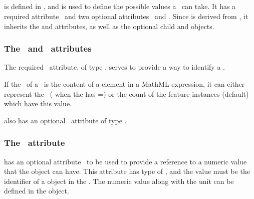 \subsection{}
\label{def:PossibleSpeciesFeatureValue}

 is defined in , and is used to define the possible values a \speciesFeature\ can take. It has a required attribute \idAtt\ and two optional attributes \nameAtt\ and \numericValueAtt.  Since  is derived from , it inherits the  and  attributes, as well as the optional \mBlockChangedBegin{\revTwentyTwentyMarch}child\mBlockChangedEnd{\revTwentyTwentyMarch}  and  objects. 

\subsubsection{The \idAtt\ and \nameAtt\ attributes}
\label{def:PossibleSpeciesFeatureValue:idAndName}

The required \idAtt\ attribute, of type \SIdPT, serves to provide a way to identify a \possibleSpeciesFeatureValue. 

If the \idAtt\ of a \possibleSpeciesFeatureValue\ is the content of a  element in a MathML expression, it can either represent the \numericValueAtt\ ( when the  has \representationTypeAtt=) or the count of the feature instances (default) which have this value. 


 also has an optional \nameAtt\ attribute of type \stringPT. 

\subsubsection{The \numericValueAtt\ attribute}
\label{def:PossibleSpeciesFeatureValue:numericValue}

 has an optional attribute \numericValueAtt\ to be used to provide a reference to a numeric value that the  object can have. This attribute has type of \SIdRefPT, and the value must be the identifier of a \Parameter object in the \model. The numeric value along with the unit can be defined in the \Parameter object. 

